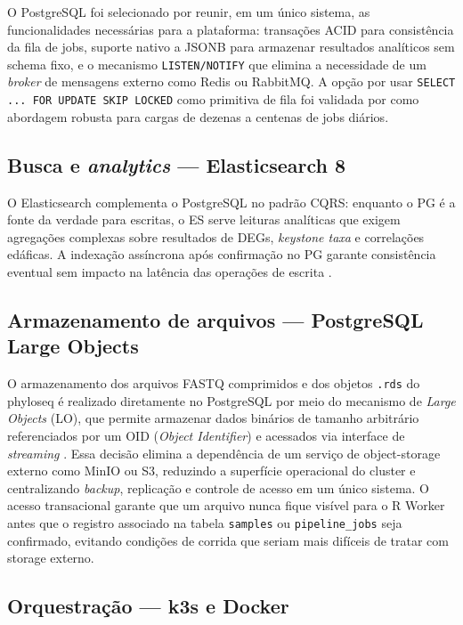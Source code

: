 O PostgreSQL foi selecionado por reunir, em um único sistema, as
funcionalidades necessárias para a plataforma: transações ACID para
consistência da fila de jobs, suporte nativo a JSONB para armazenar
resultados analíticos sem schema fixo, e o mecanismo
\texttt{LISTEN/NOTIFY} que elimina a necessidade de um \textit{broker}
de mensagens externo como Redis ou RabbitMQ. A opção por usar
\texttt{SELECT ... FOR UPDATE SKIP LOCKED} como primitiva de fila
foi validada por  como abordagem
robusta para cargas de dezenas a centenas de jobs diários.

\subsection{Busca e \textit{analytics} — Elasticsearch 8}

O Elasticsearch complementa o PostgreSQL no padrão CQRS: enquanto o
PG é a fonte da verdade para escritas, o ES serve leituras analíticas
que exigem agregações complexas sobre resultados de DEGs,
\textit{keystone taxa} e correlações edáficas. A indexação assíncrona
após confirmação no PG garante consistência eventual sem impacto na
latência das operações de escrita \cite{elastic2023docs}.

\subsection{Armazenamento de arquivos — PostgreSQL Large Objects}

O armazenamento dos arquivos FASTQ comprimidos e dos objetos
\texttt{.rds} do phyloseq é realizado diretamente no PostgreSQL por
meio do mecanismo de \textit{Large Objects} (LO), que permite
armazenar dados binários de tamanho arbitrário referenciados por um
OID (\textit{Object Identifier}) e acessados via interface de
\textit{streaming} \cite{postgresql2023docs}. Essa decisão elimina a
dependência de um serviço de object-storage externo como MinIO ou S3,
reduzindo a superfície operacional do cluster e centralizando
\textit{backup}, replicação e controle de acesso em um único sistema.
O acesso transacional garante que um arquivo nunca fique visível para
o R Worker antes que o registro associado na tabela \texttt{samples}
ou \texttt{pipeline\_jobs} seja confirmado, evitando condições de
corrida que seriam mais difíceis de tratar com storage externo.

\subsection{Orquestração — k3s e Docker}

